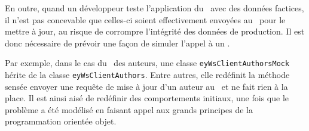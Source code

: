En outre, quand un développeur teste l'application du \alotdeux\ avec des données factices, il n'est pas concevable que celles-ci soient effectivement envoyées au \alotun\ pour le mettre à jour, au risque de corrompre l'intégrité des données de production. Il est donc nécessaire de prévoir une façon de simuler l'appel à un \aws.

Par exemple, dans le cas du \aws\ des auteurs, une classe \texttt{ey\-Ws\-Client\-Authors\-Mock} hérite de la classe \texttt{eyWsClientAuthors}. Entre autres, elle redéfinit la méthode sensée envoyer une requête de mise à jour d'un auteur au \alotun\ et ne fait rien à la place. Il est ainsi aisé de redéfinir des comportements initiaux, une fois que le problème a été modélisé en faisant appel aux grands principes de la programmation orientée objet.
